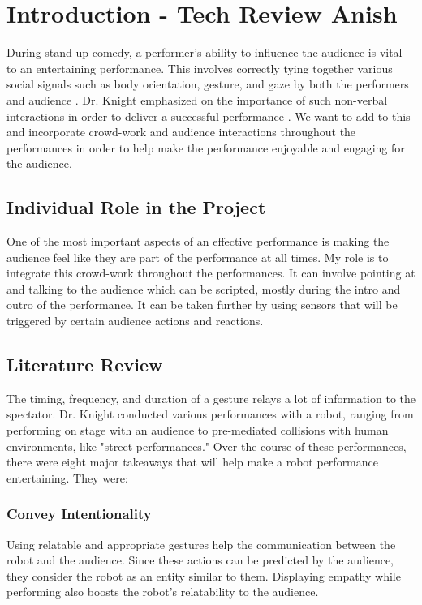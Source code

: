 

\section{Introduction - Tech Review Anish}
During stand-up comedy, a performer's ability to influence the audience is vital to an entertaining performance. This involves correctly tying together various social signals such as body orientation, gesture, and gaze by both the performers and audience \cite{RobotComedyLab:2015}. Dr. Knight emphasized on the importance of such non-verbal interactions in order to deliver a successful performance \cite{KnightEightLessons:2011}. We want to add to this and incorporate crowd-work and audience interactions throughout the performances in order to help make the performance enjoyable and engaging for the audience.

\subsection{Individual Role in the Project}
One of the most important aspects of an effective performance is making the audience feel like they are part of the performance at all times. My role is to integrate this crowd-work throughout the performances. It can involve pointing at and talking to the audience which can be scripted, mostly during the intro and outro of the performance. It can be taken further by using sensors that will be triggered by certain audience actions and reactions.

\subsection{Literature Review}
The timing, frequency, and duration of a gesture relays a lot of information to the spectator. Dr. Knight conducted various performances with a robot, ranging from performing on stage with an audience to pre-mediated collisions with human environments, like "street performances." Over the course of these performances, there were eight major takeaways that will help make a robot performance entertaining. They were:

\subsubsection{Convey Intentionality}
Using relatable and appropriate gestures help the communication between the robot and the audience. Since these actions can be predicted by the audience, they consider the robot as an entity similar to them. Displaying empathy while performing also boosts the robot's relatability to the audience.

